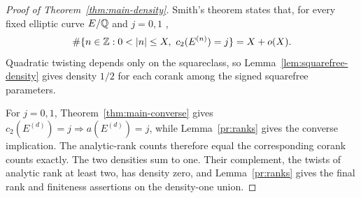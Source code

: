 \begin{proof}[Proof of Theorem~\ref{thm:main-density}]
Smith's theorem states that, for every fixed elliptic curve $E/\mathbb Q$
and $j=0,1$ \citep[Theorem~1.1]{Smith2025},
\[
 \#\{n\in\Z:0<|n|\le X,\ c_2(E^{(n)})=j\}=X+o(X)
 .
\]
Quadratic twisting depends only on the squareclass, so
Lemma~\ref{lem:squarefree-density} gives density $1/2$ for each
corank among the signed squarefree parameters.

For $j=0,1$, Theorem~\ref{thm:main-converse} gives
$c_2(E^{(d)})=j\Rightarrow a(E^{(d)})=j$, while
Lemma~\ref{pr:ranks} gives the converse implication.
The analytic-rank counts therefore equal the corresponding corank
counts exactly. The two densities sum to one. Their complement,
the twists of analytic rank at least two, has density zero, and
Lemma~\ref{pr:ranks} gives the final rank and finiteness assertions
on the density-one union.
\end{proof}
